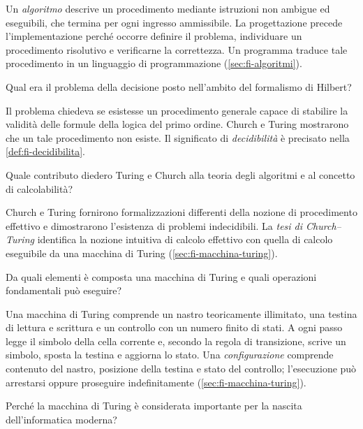 Un \emph{algoritmo} descrive un procedimento mediante istruzioni
non ambigue ed eseguibili, che termina per ogni ingresso ammissibile.
La progettazione precede l'implementazione perché occorre definire
il problema, individuare un procedimento risolutivo e verificarne la
correttezza. Un programma traduce tale procedimento in un linguaggio
di programmazione (\cref{sec:fi-algoritmi}).

\begin{exercise}
\label{ex:fi-intro-problema-decisione}
Qual era il problema della decisione posto nell'ambito del formalismo
di Hilbert?
\end{exercise}

Il problema chiedeva se esistesse un procedimento generale capace
di stabilire la validità delle formule della logica del primo ordine.
Church e Turing mostrarono che un tale procedimento non esiste.
Il significato di \emph{decidibilità} è precisato nella
\cref{def:fi-decidibilita}.

\begin{exercise}
\label{ex:fi-intro-church-turing}
Quale contributo diedero Turing e Church alla teoria degli algoritmi
e al concetto di calcolabilità?
\end{exercise}

Church e Turing fornirono formalizzazioni differenti della nozione
di procedimento effettivo e dimostrarono l'esistenza di problemi
indecidibili. La \emph{tesi di Church--Turing} identifica la nozione
intuitiva di calcolo effettivo con quella di calcolo eseguibile da
una macchina di Turing (\cref{sec:fi-macchina-turing}).

\clearpage

\begin{exercise}
\label{ex:fi-intro-turing-operazioni}
Da quali elementi è composta una macchina di Turing e quali
operazioni fondamentali può eseguire?
\end{exercise}

Una macchina di Turing comprende un nastro teoricamente illimitato,
una testina di lettura e scrittura e un controllo con un numero finito
di stati. A ogni passo legge il simbolo della cella corrente e, secondo
la regola di transizione, scrive un simbolo, sposta la testina e
aggiorna lo stato.
Una \emph{configurazione} comprende contenuto del nastro, posizione
della testina e stato del controllo; l'esecuzione può arrestarsi oppure
proseguire indefinitamente (\cref{sec:fi-macchina-turing}).

\begin{exercise}
\label{ex:fi-intro-importanza-turing}
Perché la macchina di Turing è considerata importante per la nascita
dell'informatica moderna?
\end{exercise}

